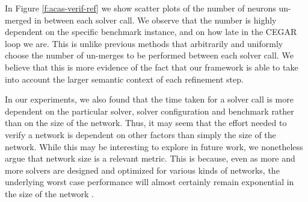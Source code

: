 In Figure \ref{f:acas-verif-ref} we show scatter plots of the number of neurons
un-merged in between each solver call. We observe that the number is highly
dependent on the specific benchmark instance,
and on how late in the CEGAR loop we are. This is unlike previous methods
that arbitrarily and uniformly choose the number of un-merges
\cite{cegar-nn} to be performed between each solver call. We believe
that this is more evidence of the fact that our framework is able to take into
account the larger semantic context of each refinement step. 

In our experiments, we also found that the time taken for a solver call is more
dependent on the particular solver, solver configuration and benchmark rather
than on the size of the network. Thus, it may seem that the effort needed to
verify a network is dependent on other factors than simply the size of the
network. While this may be interesting to explore in future work, we nonetheless
argue that network size is a relevant metric. This is because, even as more and
more solvers
are designed and optimized for various kinds of networks, the underlying worst
case performance will almost certainly remain exponential in the size of the
network
\cite{reluplex}.

